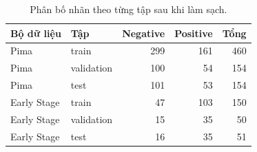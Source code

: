 \par\FloatBarrier\begin{table}[H]\centering\small{}\setlength{\tabcolsep}{5pt}
\caption{Phân bố nhãn theo từng tập sau khi làm sạch.}\begin{tabular}{llrrr}\toprule
Bộ dữ liệu & Tập & Negative & Positive & Tổng\\\midrule
Pima & train & 299 & 161 & 460\\
Pima & validation & 100 & 54 & 154\\
Pima & test & 101 & 53 & 154\\
Early Stage & train & 47 & 103 & 150\\
Early Stage & validation & 15 & 35 & 50\\
Early Stage & test & 16 & 35 & 51\\\bottomrule\end{tabular}\end{table}
